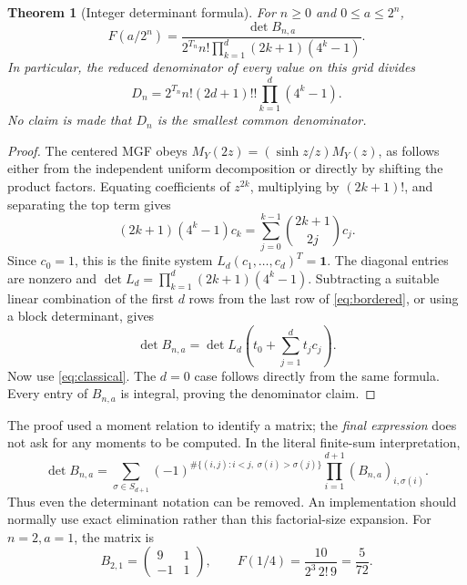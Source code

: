 \documentclass[11pt,oneside]{article}
\newtheorem{theorem}{Theorem}[section]
\theoremstyle{definition}\newtheorem{definition}[theorem]{Definition}
\theoremstyle{remark}\newtheorem{remark}[theorem]{Remark}
\begin{document}
\begin{theorem}[Integer determinant formula]
\label{thm:det}
For $n\ge0$ and $0\le a\le2^n$,
\begin{equation}
 \boxed{\displaystyle
 F(a/2^n)=
 \frac{\det B_{n,a}}
 {2^{T_n}n!\displaystyle\prod_{k=1}^{d}(2k+1)(4^k-1)}.}
 \label{eq:detvalue}
\end{equation}
In particular, the reduced denominator of every value on this grid divides
\begin{equation}
 D_n=2^{T_n}n!(2d+1)!!\prod_{k=1}^{d}(4^k-1).
 \label{eq:denombound}
\end{equation}
No claim is made that $D_n$ is the smallest common denominator.
\end{theorem}
\begin{proof}
The centered MGF obeys
$M_Y(2z)=(\sinh z/z)M_Y(z)$, as follows either from the independent
uniform decomposition or directly by shifting the product factors.
Equating coefficients of $z^{2k}$, multiplying by $(2k+1)!$, and separating
the top term gives
\[
 (2k+1)(4^k-1)c_k=\sum_{j=0}^{k-1}\binom{2k+1}{2j}c_j.
\]
Since $c_0=1$, this is the finite system
$L_d(c_1,\ldots,c_d)^T=\boldsymbol 1$.
The diagonal entries are nonzero and
$\det L_d=\prod_{k=1}^d(2k+1)(4^k-1)$.
Subtracting a suitable linear combination of the first $d$ rows from the
last row of \eqref{eq:bordered}, or using a block determinant, gives
\[
 \det B_{n,a}=\det L_d\left(t_0+\sum_{j=1}^{d}t_jc_j\right).
\]
Now use \eqref{eq:classical}. The $d=0$ case follows directly from the
same formula. Every entry of $B_{n,a}$ is integral, proving the denominator
claim.
\end{proof}

The proof used a moment relation to identify a matrix; the \emph{final
expression} does not ask for any moments to be computed. In the literal
finite-sum interpretation,
\begin{equation}
 \det B_{n,a}=\sum_{\sigma\in S_{d+1}}
 (-1)^{\#\{(i,j):i<j,\ \sigma(i)>\sigma(j)\}}
 \prod_{i=1}^{d+1}(B_{n,a})_{i,\sigma(i)}.
 \label{eq:detfinite}
\end{equation}
Thus even the determinant notation can be removed. An implementation should
normally use exact elimination rather than this factorial-size expansion.
For $n=2,a=1$, the matrix is
\[
 B_{2,1}=\begin{pmatrix}9&1\\-1&1\end{pmatrix},
 \qquad F(1/4)=\frac{10}{2^3\,2!\,9}=\frac5{72}.
\]
\end{document}
